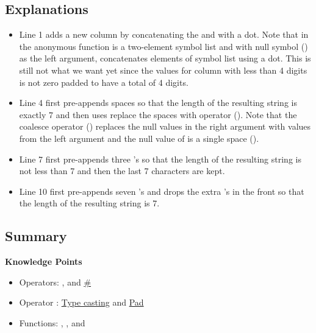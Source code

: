 \subsection{Explanations}
\begin{itemize}
\item Line 1 adds a new column  by concatenating the  and  with a dot. Note that  in the anonymous function is a two-element symbol list and with null symbol () as the left argument,  concatenates elements of symbol list using a dot. This is still not what we want yet since the values for  column with less than 4 digits is not zero padded to have a total of 4 digits. 
\item Line 4 first pre-appends spaces so that the length of the resulting string is exactly 7 and then uses  replace the spaces with operator (\q{^}). Note that the coalesce operator (\q{^}) replaces the null values in the right argument with values from the left argument and the null value of  is a single space (). 
\item Line 7 first pre-appends three 's so that the length of the resulting string is not less than 7 and then the last 7 characters are kept.
\item Line 10 first pre-appends seven 's and drops the extra 's in the front so that the length of the resulting string is 7.
\end{itemize}


\subsection{Summary}

\begin{noteblock}
\textbf{Knowledge Points}
\begin{itemize}
\item Operators: \href{https://code.kx.com/q/ref/coalesce/}{\q{^}}, \href{https://code.kx.com/q/ref/drop/}{\q{_}} and \href{https://code.kx.com/q/ref/take/}{\#}
\item Operator \q{$}: \href{https://code.kx.com/q/ref/cast/}{Type casting} and \href{https://code.kx.com/q/ref/pad/}{Pad}
\item Functions: \href{https://code.kx.com/q/ref/count/}{}, \href{https://code.kx.com/q/ref/string/}{}, \href{https://code.kx.com/q/ref/each/}{} and \href{https://code.kx.com/q/ref/flip/}{}
\end{itemize}
\end{noteblock}


